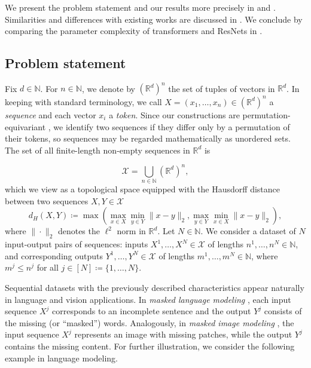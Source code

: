 \documentclass[pdflatex,sn-mathphys-num]{sn-jnl}%
\theoremstyle{thmstyleone}%
\theoremstyle{thmstyletwo}%
\theoremstyle{thmstylethree}%
\numberwithin{equation}{section}
\newcommand{\R}{\mathbb{R}}
\newcommand{\N}{\mathbb{N}}
\begin{document}
We present the problem statement and our results more precisely in  and . Similarities and differences with existing works are discussed in . We conclude by comparing the parameter complexity of transformers and ResNets in . 

\subsection{Problem statement}\label{ss:prob.statement}
Fix $d\in \N$. 
For $n \in \mathbb{N}$, we denote by $(\mathbb{R}^d)^n$ the set of tuples of vectors in $\mathbb{R}^d$.
In keeping with standard terminology, we call $X = (x_1, \ldots, x_n) \in (\mathbb{R}^d)^n$ a \emph{sequence} and each vector $x_i$ a \emph{token}. 
Since our constructions are permutation-equivariant \cite{yunAreTransformersUniversal2020}, we identify two sequences if they differ only by a permutation of their tokens, so sequences may be regarded mathematically as unordered sets.
The set of all finite-length non-empty sequences in $\mathbb{R}^d$ is

\begin{equation*}
    \mathcal{X} = \bigcup_{n \in \N} (\R^d)^n,
\end{equation*}
which we view as a topological space equipped with the Hausdorff distance between two sequences $X,Y \in \mathcal{X}$
\begin{equation}\label{eq:hausdorffDistance}
    d_H (X,Y) \coloneqq \max \left( \max_{x\in X} \min_{y\in Y} \| x - y\|_2, \max_{y\in Y} \min_{x\in X} \| x - y\|_2 \right),
\end{equation}
where $\| \cdot \|_2$ denotes the $\ell^2$ norm in $\R^d$. Let $N\in \N$. We consider a dataset of $N$ input-output pairs of sequences: inputs $X^1,\ldots,X^N \in \mathcal{X}$ of lengths $n^1, \dots, n^N \in \N$, and corresponding outputs $Y^1, \dots, Y^N \in \mathcal{X}$ of lengths $m^1, \dots, m^N \in \N$, where $m^j \leq n^j$ for all $j\in [N]\coloneqq \{ 1,\dots, N \}$.

Sequential datasets with the previously described characteristics appear naturally in language and vision applications. In \emph{masked language modeling} \cite{devlin-etal-2019-bert}, each input sequence $X^j$ corresponds to an incomplete sentence and the output $Y^j$ consists of the missing (or ``masked'') words. Analogously, in \emph{masked image modeling} \cite{he2022masked, bao2022beit}, the input sequence $X^j$ represents an image with missing patches, while the output $Y^j$ contains the missing content. For further illustration, we consider the following example in language modeling. 
\end{document}
